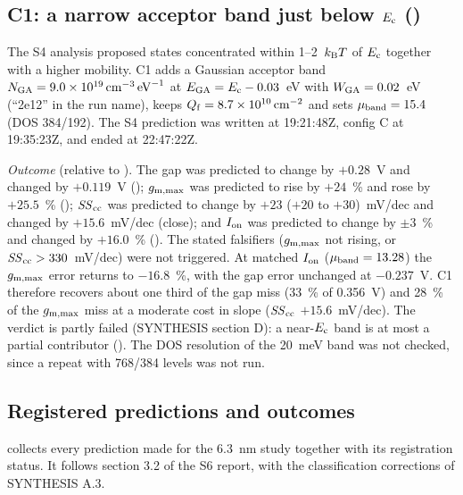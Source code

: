 \subsection{C1: a narrow acceptor band just below $E_{\mathrm{c}}$ ()}
The S4 analysis proposed states concentrated within 1--2~$k_{\mathrm{B}}T$ of $E_{\mathrm{c}}$ together with a higher mobility. C1 adds a Gaussian acceptor band $N_{\mathrm{GA}}=\SI{9.0e19}{cm^{-3}.eV^{-1}}$ at $E_{\mathrm{GA}}=E_{\mathrm{c}}-0.03$~eV with $W_{\mathrm{GA}}=0.02$~eV (``2e12'' in the run name), keeps $Q_{\mathrm{f}}=\SI{8.7e10}{cm^{-2}}$ and sets $\mu_{\mathrm{band}}=15.4$ (DOS 384/192). The S4 prediction was written at 19:21:48Z, config C at 19:35:23Z, and  ended at 22:47:22Z.

\emph{Outcome} (relative to ). The gap was predicted to change by $+0.28$~V and changed by $+0.119$~V (\fail); $g_{\mathrm{m,max}}$ was predicted to rise by $+24$~\% and rose by $+25.5$~\% (\pass); $\mathit{SS}_{\mathrm{cc}}$ was predicted to change by $+23$ ($+20$ to $+30$)~mV/dec and changed by $+15.6$~mV/dec (close); and $I_{\mathrm{on}}$ was predicted to change by $\pm3$~\% and changed by $+16.0$~\% (\fail). The stated falsifiers ($g_{\mathrm{m,max}}$ not rising, or $\mathit{SS}_{\mathrm{cc}}>330$~mV/dec) were not triggered. At matched $I_{\mathrm{on}}$ ($\mu_{\mathrm{band}}=13.28$) the $g_{\mathrm{m,max}}$ error returns to $-16.8$~\%, with the gap error unchanged at $-0.237$~V. C1 therefore recovers about one third of the gap miss (33~\% of 0.356~V) and 28~\% of the $g_{\mathrm{m,max}}$ miss at a moderate cost in slope ($\mathit{SS}_{\mathrm{cc}}$ $+15.6$~mV/dec). The verdict is partly failed (SYNTHESIS section D): a near-$E_{\mathrm{c}}$ band is at most a partial contributor (\evOOS). The DOS resolution of the 20~meV band was not checked, since a repeat with 768/384 levels was not run.

\subsection{Registered predictions and outcomes}
 collects every prediction made for the 6.3~nm study together with its registration status. It follows section 3.2 of the S6 report, with the classification corrections of SYNTHESIS A.3.

